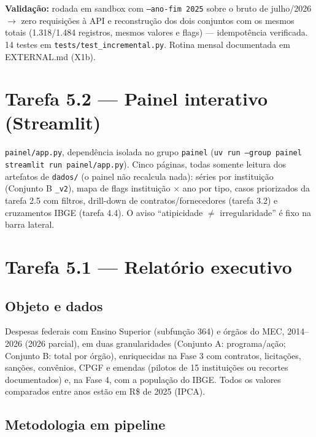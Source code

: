 \documentclass[11pt,a4paper]{article}
\begin{document}
\textbf{Validação:} rodada em sandbox com \texttt{--ano-fim 2025} sobre o
bruto de julho/2026 $\rightarrow$ zero requisições à API e reconstrução
dos dois conjuntos com os mesmos totais (1.318/1.484 registros, mesmos
valores e flags) --- idempotência verificada. 14 testes em
\texttt{tests/test\_incremental.py}. Rotina mensal documentada em
EXTERNAL.md (X1b).

\section{Tarefa 5.2 --- Painel interativo (Streamlit)}

\texttt{painel/app.py}, dependência isolada no grupo \texttt{painel}
(\texttt{uv run --group painel streamlit run painel/app.py}). Cinco
páginas, todas somente leitura dos artefatos de \texttt{dados/} (o painel
não recalcula nada): séries por instituição (Conjunto B \texttt{\_v2}),
mapa de flags instituição $\times$ ano por tipo, casos priorizados da
tarefa 2.5 com filtros, drill-down de contratos/fornecedores (tarefa 3.2)
e cruzamentos IBGE (tarefa 4.4). O aviso ``atipicidade $\neq$
irregularidade'' é fixo na barra lateral.

\section{Tarefa 5.1 --- Relatório executivo}

\subsection*{Objeto e dados}

Despesas federais com Ensino Superior (subfunção 364) e órgãos do MEC,
2014--2026 (2026 parcial), em duas granularidades (Conjunto A:
programa/ação; Conjunto B: total por órgão), enriquecidas na Fase 3 com
contratos, licitações, sanções, convênios, CPGF e emendas (pilotos de 15
instituições ou recortes documentados) e, na Fase 4, com a população do
IBGE. Todos os valores comparados entre anos estão em R\$ de 2025 (IPCA).

\subsection*{Metodologia em pipeline}
\end{document}
